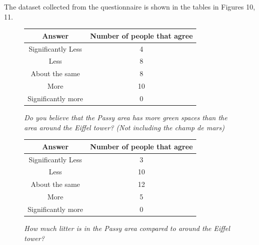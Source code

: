 \documentclass[11pt,letterpaper]{article}
\begin{document}
The dataset collected from the questionnaire is shown in the tables in Figures 10, 11.

\begin{figure}[H]
    \begin{center}
        \begin{tabular}{||c c||}
            \hline
            Answer             & Number of people that agree \\ [0.5ex]
            \hline\hline
            Significantly Less & 4                           \\
            \hline
            Less               & 8                           \\
            \hline
            About the same     & 8                           \\
            \hline
            More               & 10                          \\
            \hline
            Significantly more & 0                           \\ [1ex]
            \hline
        \end{tabular}
    \end{center}
    \caption{\textit{Do you believe that the Passy area has more green spaces than the area around the Eiffel tower? (Not including the champ de mars)}}
\end{figure}

\begin{figure}[H]
    \begin{center}
        \begin{tabular}{||c c||}
            \hline
            Answer             & Number of people that agree \\ [0.5ex]
            \hline\hline
            Significantly Less & 3                           \\
            \hline
            Less               & 10                           \\
            \hline
            About the same     & 12                           \\
            \hline
            More               & 5                          \\
            \hline
            Significantly more & 0                           \\ [1ex]
            \hline
        \end{tabular}
    \end{center}
    \caption{\textit{How much litter is in the Passy area compared to around the Eiffel tower?}}
\end{figure}
\end{document}
